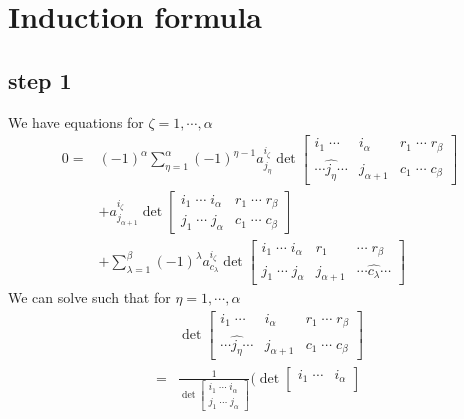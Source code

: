 \documentclass{amsart}
\begin{document}
\section{Induction formula}
{
    \subsection{step 1}
    {
        We have equations for $\zeta=1,\cdots,\alpha$ 
        \begin{align}
            0={}&(-1)^\alpha\sum_{\eta=1}^\alpha(-1)^{\eta-1}a^{i_\zeta}_{j_\eta}\det\begin{bmatrix}
                i_1\;\cdots&i_\alpha&r_1\;\cdots\; r_\beta\\
                \cdots\widehat{j_\eta}\cdots&j_{\alpha+1}&c_1\;\cdots\; c_\beta
            \end{bmatrix}\\
            &+a^{i_\zeta}_{j_{\alpha+1}}\det\begin{bmatrix}
                i_1\;\cdots\;i_\alpha&r_1\;\cdots\;r_\beta\\
                j_1\;\cdots\;j_\alpha&c_1\;\cdots\;c_\beta
            \end{bmatrix}\\
            &+\sum_{\lambda=1}^\beta(-1)^\lambda a^{i_\zeta}_{c_\lambda}\det\begin{bmatrix}
                i_1\;\cdots\;i_\alpha&r_1&\cdots\;r_\beta\\
                j_1\;\cdots\;j_\alpha&j_{\alpha+1}&\cdots\widehat{c_\lambda}\cdots
            \end{bmatrix}
        \end{align}
        We can solve such that for $\eta=1,\cdots,\alpha$
        \begin{align}
            &\det\begin{bmatrix}
                i_1\;\cdots&i_\alpha&r_1\;\cdots\;r_\beta\\
                \cdots\widehat{j_\eta}\cdots&j_{\alpha+1}&c_1\;\cdots\;c_\beta
            \end{bmatrix}\\
            ={}&\frac{1}{\det\begin{bmatrix}
                i_1\;\cdots\;i_\alpha\\
                j_1\;\cdots\;j_\alpha
            \end{bmatrix}}\Bigg(\det\begin{bmatrix}
                i_1\;\cdots&i_\alpha\\

\end{bmatrix}
\end{align}}}
\end{document}
